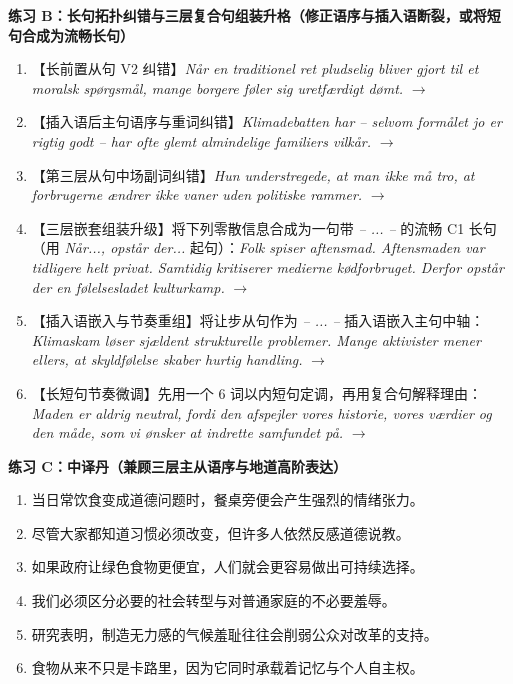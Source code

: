 \textbf{练习 B：长句拓扑纠错与三层复合句组装升格（修正语序与插入语断裂，或将短句合成为流畅长句）}
\begin{enumerate}
  \item 【长前置从句 V2 纠错】\textit{Når en traditionel ret pludselig bliver gjort til et moralsk spørgsmål, mange borgere føler sig uretfærdigt dømt.} $\rightarrow$
  \item 【插入语后主句语序与重词纠错】\textit{Klimadebatten har -- selvom formålet jo er rigtig godt -- har ofte glemt almindelige familiers vilkår.} $\rightarrow$
  \item 【第三层从句中场副词纠错】\textit{Hun understregede, at man ikke må tro, at forbrugerne ændrer ikke vaner uden politiske rammer.} $\rightarrow$
  \item 【三层嵌套组装升级】将下列零散信息合成为一句带 \textit{-- ... --} 的流畅 C1 长句（用 \textit{Når..., opstår der...} 起句）：\textit{Folk spiser aftensmad. Aftensmaden var tidligere helt privat. Samtidig kritiserer medierne kødforbruget. Derfor opstår der en følelsesladet kulturkamp.} $\rightarrow$
  \item 【插入语嵌入与节奏重组】将让步从句作为 \textit{-- ... --} 插入语嵌入主句中轴：\textit{Klimaskam løser sjældent strukturelle problemer. Mange aktivister mener ellers, at skyldfølelse skaber hurtig handling.} $\rightarrow$
  \item 【长短句节奏微调】先用一个 6 词以内短句定调，再用复合句解释理由：\textit{Maden er aldrig neutral, fordi den afspejler vores historie, vores værdier og den måde, som vi ønsker at indrette samfundet på.} $\rightarrow$
\end{enumerate}

\textbf{练习 C：中译丹（兼顾三层主从语序与地道高阶表达）}
\begin{enumerate}
  \item 当日常饮食变成道德问题时，餐桌旁便会产生强烈的情绪张力。
  \item 尽管大家都知道习惯必须改变，但许多人依然反感道德说教。
  \item 如果政府让绿色食物更便宜，人们就会更容易做出可持续选择。
  \item 我们必须区分必要的社会转型与对普通家庭的不必要羞辱。
  \item 研究表明，制造无力感的气候羞耻往往会削弱公众对改革的支持。
  \item 食物从来不只是卡路里，因为它同时承载着记忆与个人自主权。
\end{enumerate}


